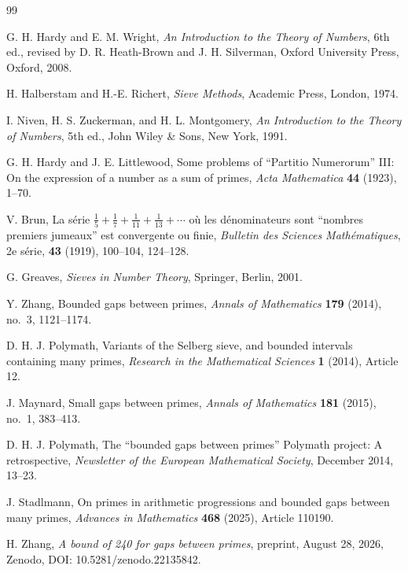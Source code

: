 \documentclass[11pt,a4paper]{article}
\theoremstyle{definition}
\theoremstyle{remark}
\begin{document}
\begin{thebibliography}{99}

G. H. Hardy and E. M. Wright,
\textit{An Introduction to the Theory of Numbers},
6th ed., revised by D. R. Heath-Brown and J. H. Silverman,
Oxford University Press, Oxford, 2008.

H. Halberstam and H.-E. Richert,
\textit{Sieve Methods},
Academic Press, London, 1974.

I. Niven, H. S. Zuckerman, and H. L. Montgomery,
\textit{An Introduction to the Theory of Numbers},
5th ed., John Wiley & Sons, New York, 1991.

G. H. Hardy and J. E. Littlewood,
Some problems of ``Partitio Numerorum'' III:
On the expression of a number as a sum of primes,
\textit{Acta Mathematica} \textbf{44} (1923), 1--70.

V. Brun,
La série $\frac{1}{5}+\frac{1}{7}+\frac{1}{11}+\frac{1}{13}+\cdots$
où les dénominateurs sont ``nombres premiers jumeaux''
est convergente ou finie,
\textit{Bulletin des Sciences Mathématiques},
2e série, \textbf{43} (1919), 100--104, 124--128.

G. Greaves,
\textit{Sieves in Number Theory},
Springer, Berlin, 2001.

Y. Zhang,
Bounded gaps between primes,
\textit{Annals of Mathematics} \textbf{179} (2014), no.~3, 1121--1174.

D. H. J. Polymath,
Variants of the Selberg sieve, and bounded intervals containing many primes,
\textit{Research in the Mathematical Sciences} \textbf{1} (2014),
Article 12.

J. Maynard,
Small gaps between primes,
\textit{Annals of Mathematics} \textbf{181} (2015), no.~1, 383--413.

D. H. J. Polymath,
The ``bounded gaps between primes'' Polymath project:
A retrospective,
\textit{Newsletter of the European Mathematical Society},
December 2014, 13--23.

J. Stadlmann,
On primes in arithmetic progressions and bounded gaps between many primes,
\textit{Advances in Mathematics} \textbf{468} (2025),
Article 110190.

H. Zhang,
\textit{A bound of 240 for gaps between primes},
preprint, August 28, 2026,
Zenodo, DOI: 10.5281/zenodo.22135842.


\end{thebibliography}
\end{document}

